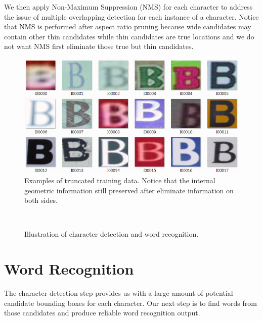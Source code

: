 \documentclass[10pt,twocolumn,letterpaper]{article}
\begin{document}
We then apply Non-Maximum Suppression (NMS) for each character to address the issue of multiple overlapping detection for each instance of a character. Notice that NMS is performed after aspect ratio pruning because wide candidates may contain other thin candidates while thin candidates are true locations and we do not want NMS first eliminate those true but thin candidates.

\begin{figure}[t]
\begin{center}
\includegraphics[width=1\linewidth]{fig/train_data}
\end{center}
   \caption{Examples of truncated training data. Notice that the internal geometric information still preserved after eliminate information on both sides.}
\label{fig:sample1}
\end{figure}

\begin{figure}[ht]
\begin{center}$
\begin{array}{cc}
\end{array}$
\end{center}
\caption{Illustration of character detection and word recognition.}
\label{figure:end-to-end}
\end{figure}

\section{Word Recognition}

The character detection step provides us with a large amount of potential candidate bounding boxes for each character. Our next step is to find words from those candidates and produce reliable word recognition output.
\end{document}
